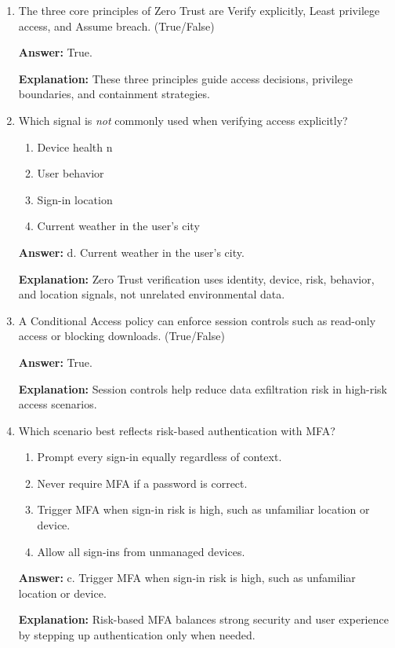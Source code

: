 \documentclass[10pt]{article}
\begin{document}
\begin{enumerate}[leftmargin=*]
\textbf{Explanation:} The model is comprehensive and cross-domain, not a single product.

\item The three core principles of Zero Trust are Verify explicitly, Least privilege access, and Assume breach. (True/False)

\textbf{Answer:} True.

\textbf{Explanation:} These three principles guide access decisions, privilege boundaries, and containment strategies.

\item Which signal is \emph{not} commonly used when verifying access explicitly?
\begin{enumerate}[label=\alph*., leftmargin=1.5em]
\item Device health
n\item User behavior
\item Sign-in location
\item Current weather in the user's city
\end{enumerate}
\textbf{Answer:} d. Current weather in the user's city.

\textbf{Explanation:} Zero Trust verification uses identity, device, risk, behavior, and location signals, not unrelated environmental data.

\item A Conditional Access policy can enforce session controls such as read-only access or blocking downloads. (True/False)

\textbf{Answer:} True.

\textbf{Explanation:} Session controls help reduce data exfiltration risk in high-risk access scenarios.

\item Which scenario best reflects risk-based authentication with MFA?
\begin{enumerate}[label=\alph*., leftmargin=1.5em]
\item Prompt every sign-in equally regardless of context.
\item Never require MFA if a password is correct.
\item Trigger MFA when sign-in risk is high, such as unfamiliar location or device.
\item Allow all sign-ins from unmanaged devices.
\end{enumerate}
\textbf{Answer:} c. Trigger MFA when sign-in risk is high, such as unfamiliar location or device.

\textbf{Explanation:} Risk-based MFA balances strong security and user experience by stepping up authentication only when needed.


\end{enumerate}
\end{document}
